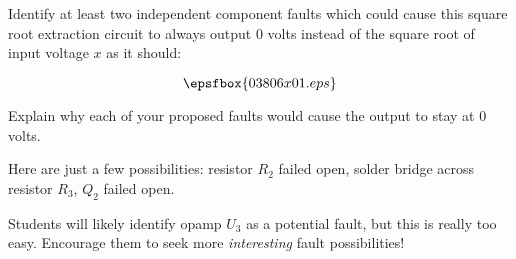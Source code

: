 

Identify at least two independent component faults which could cause this square root extraction circuit to always output 0 volts instead of the square root of input voltage $x$ as it should:

$$\epsfbox{03806x01.eps}$$

Explain why each of your proposed faults would cause the output to stay at 0 volts.







Here are just a few possibilities: resistor $R_2$ failed open, solder bridge across resistor $R_3$, $Q_2$ failed open.







Students will likely identify opamp $U_3$ as a potential fault, but this is really too easy.  Encourage them to seek more {\it interesting} fault possibilities!




